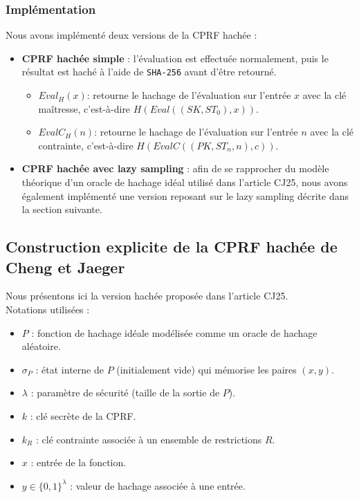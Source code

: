 \documentclass[9pt]{extarticle}
\begin{document}
\subsubsection{Implémentation}

Nous avons implémenté deux versions de la CPRF hachée :

\begin{itemize}
  \item \textbf{CPRF hachée simple} : l’évaluation est effectuée normalement,
  puis le résultat est haché à l’aide de \texttt{SHA-256} avant d’être retourné.
    \begin{itemize}
      \item \texttt{$Eval_H(x)$}: retourne le hachage de l’évaluation sur l’entrée $x$ avec la clé maîtresse, c’est-à-dire $H(Eval((SK, ST_0), x))$.
      \item \texttt{$EvalC_H(n)$}: retourne le hachage de l’évaluation sur l’entrée $n$ avec la clé contrainte, c’est-à-dire $H(EvalC((PK, ST_n, n), c))$.
    \end{itemize}

  \item \textbf{CPRF hachée avec lazy sampling} : afin de se rapprocher du modèle
  théorique d’un oracle de hachage idéal utilisé dans l'article CJ25, nous avons également implémenté
  une version reposant sur le lazy sampling décrite dans la section suivante.
\end{itemize}


\subsection{Construction explicite de la CPRF hachée de Cheng et Jaeger}

Nous présentons ici la version hachée proposée dans l'article CJ25.\\

Notations utilisées :
\begin{itemize}
  \item $P$ : fonction de hachage idéale modélisée comme un oracle de hachage aléatoire.
  \item $\sigma_P$ : état interne de $P$ (initialement vide) qui mémorise les paires $(x,y)$.
  \item $\lambda$ : paramètre de sécurité (taille de la sortie de $P$).
  \item $k$ : clé secrète de la \textsf{CPRF}.
  \item $k_R$ : clé contrainte associée à un ensemble de restrictions $R$.
  \item $x$ : entrée de la fonction.
  \item $y \in \{0,1\}^{\lambda}$ : valeur de hachage associée à une entrée.
\end{itemize}
\end{document}
